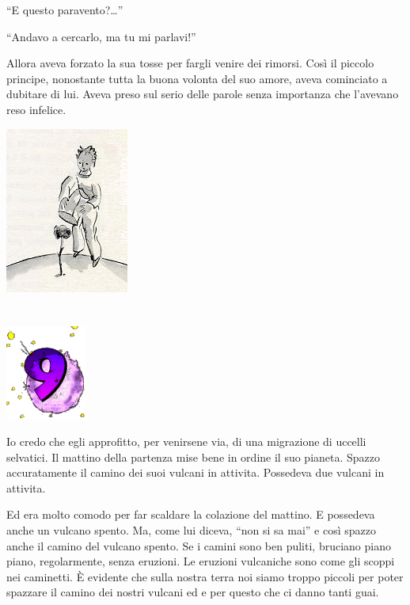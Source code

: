 \documentclass[11pt]{scrbook}
\begin{document}
``E questo paravento?\ldots{}''

``Andavo a cercarlo, ma tu mi parlavi!''

Allora aveva forzato la sua tosse per fargli venire dei rimorsi. Così il
piccolo principe, nonostante tutta la buona volonta del suo amore, aveva
cominciato a dubitare di lui. Aveva preso sul serio delle parole senza
importanza che l'avevano reso infelice.

\begin{center}
\includegraphics{img/princKvetina}
\end{center}

\chapter{}
\begin{center}
\includegraphics{img/chapter9}
\end{center}

Io credo che egli approfitto, per venirsene via, di una migrazione di
uccelli selvatici. Il mattino della partenza mise bene in ordine il suo
pianeta. Spazzo accuratamente il camino dei suoi vulcani in attivita.
Possedeva due vulcani in attivita.

Ed era molto comodo per far scaldare la colazione del mattino. E
possedeva anche un vulcano spento. Ma, come lui diceva, ``non si sa
mai'' e così spazzo anche il camino del vulcano spento. Se i camini sono
ben puliti, bruciano piano piano, regolarmente, senza eruzioni. Le
eruzioni vulcaniche sono come gli scoppi nei caminetti. È evidente che
sulla nostra terra noi siamo troppo piccoli per poter spazzare il camino
dei nostri vulcani ed e per questo che ci danno tanti guai.
\end{document}
